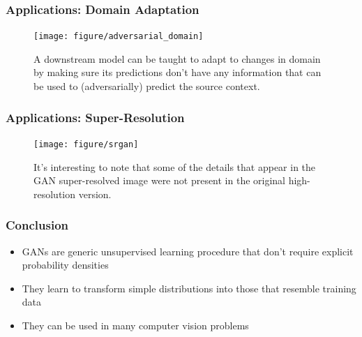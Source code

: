 \documentclass[10pt,mathserif]{beamer}
\begin{document}
\begin{frame}
  \frametitle{Applications: Domain Adaptation}
\begin{figure}[ht]
  \centering
  \texttt{[image: figure/adversarial\_domain]}
  \caption{A downstream model can be taught to adapt to changes in domain by
    making sure its predictions don't have any information that can be used to
    (adversarially) predict the source context.
    \label{fig:adapt} }
\end{figure}
\end{frame}

\begin{frame}
  \frametitle{Applications: Super-Resolution}
  \begin{figure}[ht]
  \centering
  \texttt{[image: figure/srgan]}
  \caption{It's interesting to note that some of the details that appear in the
    GAN super-resolved image were not present in the original high-resolution
    version.}
  \end{figure}
\end{frame}

\begin{frame}
  \frametitle{Conclusion}
  \begin{itemize}
    \item GANs are generic unsupervised learning procedure that don't require
      explicit probability densities
    \item They learn to transform simple distributions into those that resemble training data
    \item They can be used in many computer vision problems
  \end{itemize}
\end{frame}

\begin{frame}[allowframebreaks]
    
    
\end{frame}
\end{document}

